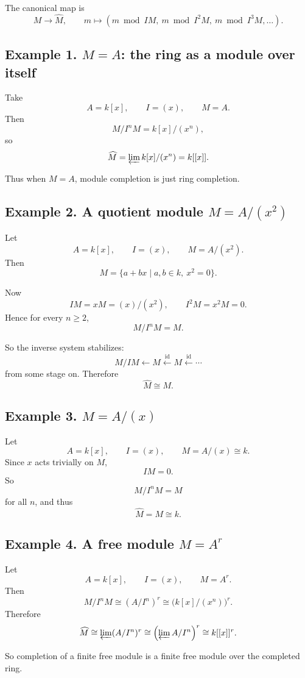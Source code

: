 \documentclass[12pt,a4paper]{article}
\theoremstyle{plain}
\theoremstyle{definition}      %
\begin{document}
	The canonical map is
	\[
	M\to \widehat M,\qquad
	m\mapsto (m\bmod IM,\ m\bmod I^2M,\ m\bmod I^3M,\dots).
	\]
	
	\subsection*{Example 1. \(M=A\): the ring as a module over itself}
	
	Take
	\[
	A=k[x],\qquad I=(x),\qquad M=A.
	\]
	Then
	\[
	M/I^nM = k[x]/(x^n),
	\]
	so
	\[
	\widehat M=\varprojlim k[x]/(x^n)=k[[x]].
	\]
	
	Thus when \(M=A\), module completion is just ring completion.
	
	\subsection*{Example 2. A quotient module \(M=A/(x^2)\)}
	
	Let
	\[
	A=k[x],\qquad I=(x),\qquad M=A/(x^2).
	\]
	Then
	\[
	M=\{a+bx \mid a,b\in k,\ x^2=0\}.
	\]
	
	Now
	\[
	IM=xM=(x)/(x^2),
	\qquad
	I^2M=x^2M=0.
	\]
	Hence for every \(n\ge 2\),
	\[
	M/I^nM=M.
	\]
	
	So the inverse system stabilizes:
	\[
	M/IM \xleftarrow{} M \xleftarrow{\mathrm{id}} M \xleftarrow{\mathrm{id}} \cdots
	\]
	from some stage on. Therefore
	\[
	\widehat M\cong M.
	\]
	
	\subsection*{Example 3. \(M=A/(x)\)}
	
	Let
	\[
	A=k[x],\qquad I=(x),\qquad M=A/(x)\cong k.
	\]
	Since \(x\) acts trivially on \(M\),
	\[
	IM=0.
	\]
	So
	\[
	M/I^nM=M
	\]
	for all \(n\), and thus
	\[
	\widehat M=M\cong k.
	\]
	
	\subsection*{Example 4. A free module \(M=A^r\)}
	
	Let
	\[
	A=k[x],\qquad I=(x),\qquad M=A^r.
	\]
	Then
	\[
	M/I^nM \cong (A/I^n)^r \cong \bigl(k[x]/(x^n)\bigr)^r.
	\]
	Therefore
	\[
	\widehat M
	\cong \varprojlim (A/I^n)^r
	\cong \left(\varprojlim A/I^n\right)^r
	\cong k[[x]]^r.
	\]
	
	So completion of a finite free module is a finite free module over the completed ring.
	
\end{document}
